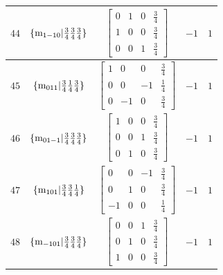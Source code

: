 \documentclass[fleqn,8pt]{jsarticle}
\begin{document}
\begin{longtable}{ccccc}
$ 44 $ & $ \{{\rm m}_{1-10}|\frac{3}{4} \frac{3}{4} \frac{3}{4}\} $ & $ \begin{bmatrix} 0 & 1 & 0 & \frac{3}{4} \\ 1 & 0 & 0 & \frac{3}{4} \\ 0 & 0 & 1 & \frac{3}{4} \end{bmatrix} $ & $ -1 $ & $ 1 $ \\ \hline
$ 45 $ & $ \{{\rm m}_{011}|\frac{3}{4} \frac{1}{4} \frac{3}{4}\} $ & $ \begin{bmatrix} 1 & 0 & 0 & \frac{3}{4} \\ 0 & 0 & -1 & \frac{1}{4} \\ 0 & -1 & 0 & \frac{3}{4} \end{bmatrix} $ & $ -1 $ & $ 1 $ \\ \hline
$ 46 $ & $ \{{\rm m}_{01-1}|\frac{3}{4} \frac{3}{4} \frac{3}{4}\} $ & $ \begin{bmatrix} 1 & 0 & 0 & \frac{3}{4} \\ 0 & 0 & 1 & \frac{3}{4} \\ 0 & 1 & 0 & \frac{3}{4} \end{bmatrix} $ & $ -1 $ & $ 1 $ \\ \hline
$ 47 $ & $ \{{\rm m}_{101}|\frac{3}{4} \frac{3}{4} \frac{1}{4}\} $ & $ \begin{bmatrix} 0 & 0 & -1 & \frac{3}{4} \\ 0 & 1 & 0 & \frac{3}{4} \\ -1 & 0 & 0 & \frac{1}{4} \end{bmatrix} $ & $ -1 $ & $ 1 $ \\ \hline
$ 48 $ & $ \{{\rm m}_{-101}|\frac{3}{4} \frac{3}{4} \frac{3}{4}\} $ & $ \begin{bmatrix} 0 & 0 & 1 & \frac{3}{4} \\ 0 & 1 & 0 & \frac{3}{4} \\ 1 & 0 & 0 & \frac{3}{4} \end{bmatrix} $ & $ -1 $ & $ 1 $ \\
\end{longtable}
\end{document}
